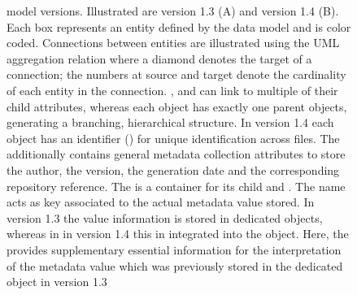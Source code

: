 \begin{figure}[hp]
    \centering
    \scalebox{1}{
    }
    \caption[ model versions]{ model versions. Illustrated are  version 1.3 (A) and version 1.4 (B). Each box represents an entity defined by the data model and is color coded. Connections between entities are illustrated using the UML aggregation relation where a diamond denotes the target of a connection; the numbers at source and target denote the cardinality of each entity in the connection. ,  and  can link to multiple of their child attributes, whereas each object has exactly one parent objects, generating a branching, hierarchical structure. In  version 1.4 each object has an identifier () for unique identification across files. The  additionally contains general metadata collection attributes to store the author, the version, the generation date and the corresponding repository reference. The  is a container for its child  and . The  name acts as key associated to the actual metadata value stored. In  version 1.3 the value information is stored in dedicated  objects, whereas in in  version 1.4 this in integrated into the  object. Here, the  provides supplementary essential information for the interpretation of the metadata value which was previously stored in the dedicated  object in  version 1.3}
    \label{fig:intro_odML_model}
\end{figure}

